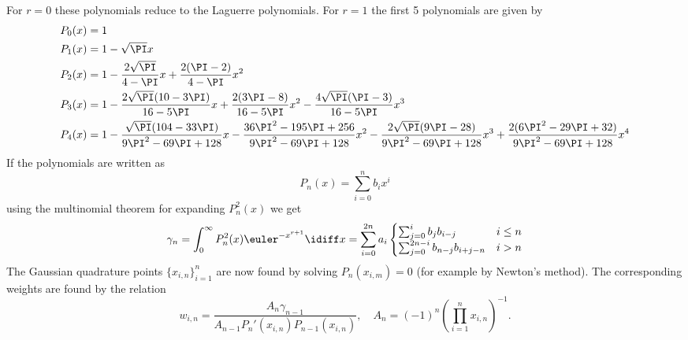For $r=0$ these polynomials reduce to the Laguerre polynomials. For $r=1$ the first 5 polynomials are given by
\begin{align*}
	P_0(x)&=1\\
	P_1(x)&=1-\sqrt{\PI}x\\
	P_2(x)&=1-\frac{2\sqrt{\PI}}{4-\PI}x+\frac{2(\PI-2)}{4-\PI}x^2\\
	P_3(x)&=1-\frac{2\sqrt{\PI}(10-3\PI)}{16-5\PI}x+\frac{2(3\PI-8)}{16-5\PI}x^2-\frac{4\sqrt{\PI}(\PI-3)}{16-5\PI}x^3\\
	P_4(x)&=1-\frac{\sqrt{\PI}(104-33\PI)}{9\PI^2-69\PI+128}x-\frac{36\PI^2-195\PI+256}{9\PI^2-69\PI+128}x^2-\frac{2\sqrt{\PI}(9\PI-28)}{9\PI^2-69\PI+128}x^3+\frac{2(6\PI^2-29\PI+32)}{9\PI^2-69\PI+128}x^4
\end{align*}
If the polynomials are written as
\begin{equation*}
	P_n(x) = \sum_{i=0}^n b_i x^i
\end{equation*}
using the multinomial theorem for expanding $P_n^2(x)$ we get
\begin{equation*}
	\gamma_n=\int_0^\infty P_n^2(x)\euler^{-x^{r+1}} \idiff x = \sum_{i=0}^{2n} a_i\begin{cases}
		\sum_{j=0}^i b_j b_{i-j} & i \leq n\\
		\sum_{j=0}^{2n-i}
			b_{n-j}b_{i+j-n} & i > n
	\end{cases}
\end{equation*}
The Gaussian quadrature points $\{x_{i,n}\}_{i=1}^n$ are now found by solving $P_n(x_{i,m})=0$ (for example by Newton's method). The corresponding weights are found by the relation \cite{Hildebrand1987itn}
\begin{equation*}
	w_{i,n} = \frac{A_n\gamma_{n-1}}{A_{n-1} P_n'(x_{i,n})P_{n-1}(x_{i,n})},\quad A_n = (-1)^n\left(\prod_{i=1}^n x_{i,n}\right)^{-1}.
\end{equation*}